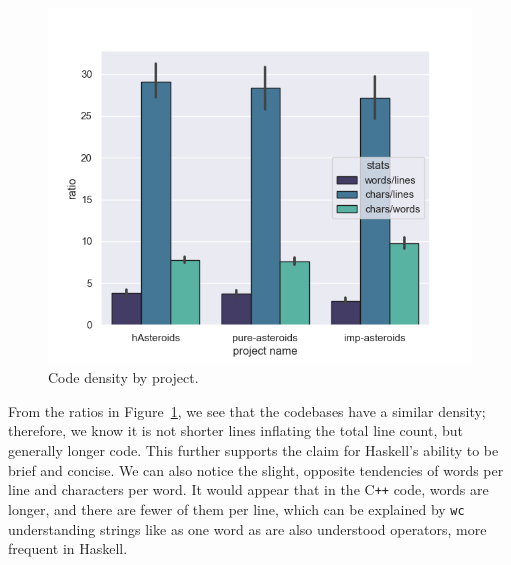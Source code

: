 \documentclass[
  digital, %
  color,   %
  table,   %
  oneside, %
  lof,     %
  lot,     %
]{fithesis3}
\newcommand{\cpp}{C\nolinebreak\texttt{+}\nolinebreak\texttt{+}}
\newcommand{\vs}{vs.\ }
\begin{document}
{\begin{figure}[H]
    \centering
    \includegraphics[width=\textwidth]{images/lwc_density_by_project.png}
    \caption{Code density by project.}
    \label{fig:codedensity}
\end{figure}

From the ratios in Figure~\ref{fig:codedensity}, we see that the codebases have a similar density;
therefore, we know it is not shorter lines inflating the total line count, but generally longer code.
This further supports the claim for Haskell's ability to be brief and concise.
We can also notice the slight, opposite tendencies of words per line and characters per word.
It would appear that in the \cpp{} code, words are longer, and there are fewer of them per line,
which can be explained by \texttt{wc} understanding strings like
 as one word as are also understood operators, more frequent in Haskell.



}
\end{document}
